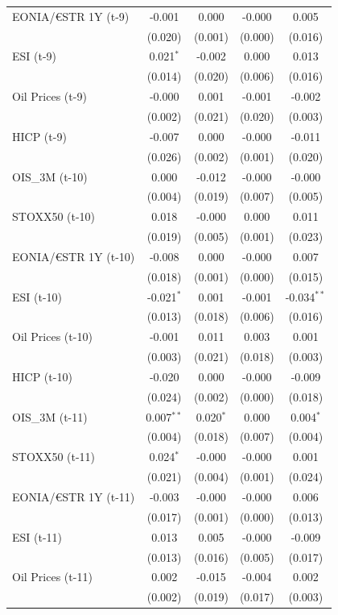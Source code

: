 \begin{longtable}[t]{lcccc}
EONIA/€STR 1Y (t-9) & -0.001 & 0.000 & -0.000 & 0.005\\
 & (0.020) & (0.001) & (0.000) & (0.016)\\
ESI (t-9) & 0.021$^{*}$ & -0.002 & 0.000 & 0.013\\
 & (0.014) & (0.020) & (0.006) & (0.016)\\
Oil Prices (t-9) & -0.000 & 0.001 & -0.001 & -0.002\\
 & (0.002) & (0.021) & (0.020) & (0.003)\\
HICP (t-9) & -0.007 & 0.000 & -0.000 & -0.011\\
 & (0.026) & (0.002) & (0.001) & (0.020)\\
OIS\_3M (t-10) & 0.000 & -0.012 & -0.000 & -0.000\\
 & (0.004) & (0.019) & (0.007) & (0.005)\\
STOXX50 (t-10) & 0.018 & -0.000 & 0.000 & 0.011\\
 & (0.019) & (0.005) & (0.001) & (0.023)\\
EONIA/€STR 1Y (t-10) & -0.008 & 0.000 & -0.000 & 0.007\\
 & (0.018) & (0.001) & (0.000) & (0.015)\\
ESI (t-10) & -0.021$^{*}$ & 0.001 & -0.001 & -0.034$^{**}$\\
 & (0.013) & (0.018) & (0.006) & (0.016)\\
Oil Prices (t-10) & -0.001 & 0.011 & 0.003 & 0.001\\
 & (0.003) & (0.021) & (0.018) & (0.003)\\
HICP (t-10) & -0.020 & 0.000 & -0.000 & -0.009\\
 & (0.024) & (0.002) & (0.000) & (0.018)\\
OIS\_3M (t-11) & 0.007$^{**}$ & 0.020$^{*}$ & 0.000 & 0.004$^{*}$\\
 & (0.004) & (0.018) & (0.007) & (0.004)\\
STOXX50 (t-11) & 0.024$^{*}$ & -0.000 & -0.000 & 0.001\\
 & (0.021) & (0.004) & (0.001) & (0.024)\\
EONIA/€STR 1Y (t-11) & -0.003 & -0.000 & -0.000 & 0.006\\
 & (0.017) & (0.001) & (0.000) & (0.013)\\
ESI (t-11) & 0.013 & 0.005 & -0.000 & -0.009\\
 & (0.013) & (0.016) & (0.005) & (0.017)\\
Oil Prices (t-11) & 0.002 & -0.015 & -0.004 & 0.002\\
 & (0.002) & (0.019) & (0.017) & (0.003)\\

\end{longtable}

